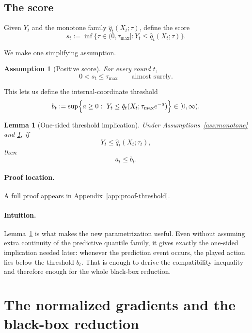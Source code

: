 \documentclass[11pt]{article}
\newtheorem{lemma}{Lemma}
\newtheorem{assumption}{Assumption}
\newcommand{\1}{\mathbf{1}}
\begin{document}
\subsection{The score}

Given $Y_t$ and the monotone family $\hat q_t(X_t;\tau)$, define the score
\begin{equation}
\label{eq:score}
s_t:=\inf\{\tau\in(0,\tau_{\max}]: Y_t\le \hat q_t(X_t;\tau)\}.
\end{equation}

We make one simplifying assumption.

\begin{assumption}[Positive score]
\label{ass:score-positive}
For every round $t$,
\[
0<s_t\le \tau_{\max}
\qquad\text{almost surely.}
\]
\end{assumption}

This lets us define the internal-coordinate threshold
\[
b_t
:=
\sup\Bigl\{
a\ge 0:\ Y_t\le \hat q_t(X_t;\tau_{\max}e^{-a})
\Bigr\}\in[0,\infty).
\]

\begin{lemma}[One-sided threshold implication]
\label{lem:threshold}
Under Assumptions~\ref{ass:monotone} and \ref{ass:score-positive}, if
\[
Y_t\le \hat q_t(X_t;\tau_t),
\]
then
\[
a_t\le b_t.
\]
\end{lemma}

\paragraph{Proof location.} A full proof appears in Appendix~\ref{app:proof-threshold}.


\paragraph{Intuition.} Lemma~\ref{lem:threshold} is what makes the new parametrization useful. Even without assuming extra continuity of the predictive quantile family, it gives exactly the one-sided implication needed later: whenever the prediction event occurs, the played action lies below the threshold \(b_t\). That is enough to derive the compatibility inequality and therefore enough for the whole black-box reduction.

\section{The normalized gradients and the black-box reduction}
\label{sec:blackbox}
\end{document}
